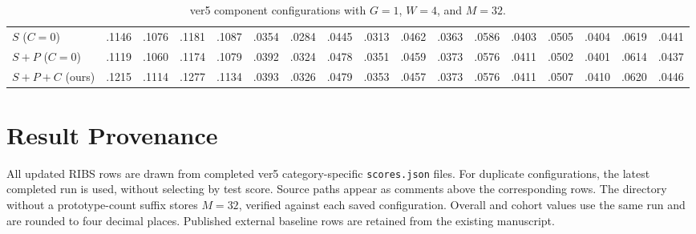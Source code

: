 \documentclass[11pt]{article}
\begin{document}
\begin{table}[!t]
{\begin{tabular}{l*{4}{rrrr}}
$S$ ($C=0$) & .1146 & .1076 & .1181 & .1087 & .0354 & .0284 & .0445 & .0313 & .0462 & .0363 & .0586 & .0403 & .0505 & .0404 & .0619 & .0441 \\
$S+P$ ($C=0$) & .1119 & .1060 & .1174 & .1079 & .0392 & .0324 & .0478 & .0351 & .0459 & .0373 & .0576 & .0411 & .0502 & .0401 & .0614 & .0437 \\
$S+P+C$ (ours) & .1215 & .1114 & .1277 & .1134 & .0393 & .0326 & .0479 & .0353 & .0457 & .0373 & .0576 & .0411 & .0507 & .0410 & .0620 & .0446 \\
\bottomrule
\end{tabular}%
}
\caption{ver5 component configurations with $G=1$, $W=4$, and $M=32$.}
\label{tab:all_components}
\end{table}

\section{Result Provenance}
\label{app:runs}
All updated RIBS rows are drawn from completed ver5 category-specific \texttt{scores.json} files. For duplicate configurations, the latest completed run is used, without selecting by test score. Source paths appear as comments above the corresponding rows. The directory without a prototype-count suffix stores $M=32$, verified against each saved configuration. Overall and cohort values use the same run and are rounded to four decimal places. Published external baseline rows are retained from the existing manuscript.
\end{document}
